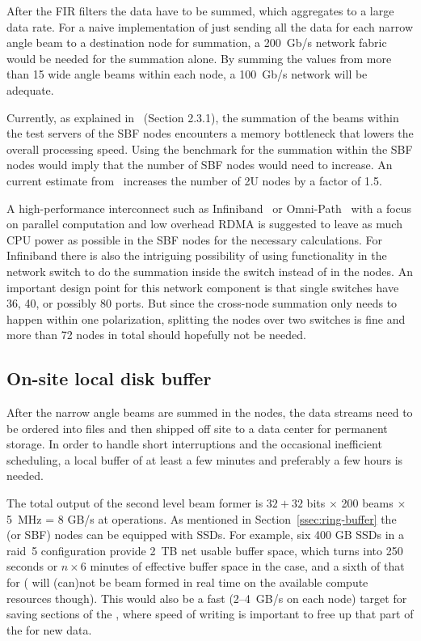 \documentclass[12pt,a4paper]{article}
\begin{document}
After the FIR filters the data have to be summed, which aggregates to a large data rate. 
For a naive implementation of just sending all the data for each narrow angle beam to a destination node for summation, a 200~Gb/s network fabric would be needed for the summation alone. 
By summing the values from more than 15 wide angle beams within each node, a 100~Gb/s network will be adequate.

Currently, as explained in~\cite{assars-note} (Section 2.3.1), the summation of the beams within the test servers of the SBF nodes encounters a memory bottleneck that lowers the overall processing speed.
Using the benchmark for the summation within the SBF nodes would imply that the number of SBF nodes would need to increase.
An current estimate from~\cite{assars-note} increases the number of 2U nodes by a factor of 1.5.

A high-performance interconnect such as Infiniband~\cite{infiniband} or Omni-Path~\cite{omnipath} with a focus on parallel computation and low overhead RDMA is suggested to leave as much CPU power as possible in the SBF nodes for the necessary calculations. 
For Infiniband there is also the intriguing possibility of using functionality in the network switch to do the summation inside the switch instead of in the nodes. 
An important design point for this network component is that single switches have 36, 40, or possibly 80 ports. 
But since the cross-node summation only needs to happen within one polarization, splitting the nodes over two switches is fine and more than 72 nodes in total should hopefully not be needed.

\subsection{On-site local disk buffer}

After the narrow angle beams are summed in the \RB nodes, the data streams need to be ordered into files and then shipped off site to a data center for permanent storage. 
In order to handle short interruptions and the occasional inefficient scheduling, a local buffer of at least a few minutes and preferably a few hours is needed.

The total output of the second level beam former is $32+32$ bits $\times$ 200 beams $\times$ 5~MHz = 8 GB/s 
at \NBW{} operations. 
As mentioned in Section~\ref{ssec:ring-buffer} the \RB (or SBF) nodes can be equipped with SSDs.
For example, six 400 GB SSDs in a raid~5 configuration provide 2~TB net usable buffer space, which turns into 250 seconds or $n\times 6$ minutes of effective buffer space in the \NBW{} case, and a sixth of that for \WBW{} (\WBW{} will (can)not be beam formed in real time on the available compute resources though). 
This would also be a fast (2--4~GB/s on each node) target for saving sections of the \RB, where speed of writing is important to free up that part of the \RB for new data.
\end{document}

